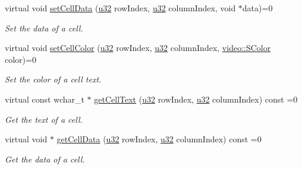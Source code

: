 \begin{DoxyCompactItemize}
\mbox{\label{classirr_1_1gui_1_1IGUITable_a88ddb4a8f63fd42a823b7f9363b9b877}} 
virtual void \hyperlink{classirr_1_1gui_1_1IGUITable_a88ddb4a8f63fd42a823b7f9363b9b877}{set\+Cell\+Data} (\hyperlink{namespaceirr_a0416a53257075833e7002efd0a18e804}{u32} row\+Index, \hyperlink{namespaceirr_a0416a53257075833e7002efd0a18e804}{u32} column\+Index, void $\ast$data)=0
\begin{DoxyCompactList}\small\item\em Set the data of a cell. \end{DoxyCompactList}\item 
\mbox{\label{classirr_1_1gui_1_1IGUITable_abc650141a64f7e9f61cc5f8521b51ab4}} 
virtual void \hyperlink{classirr_1_1gui_1_1IGUITable_abc650141a64f7e9f61cc5f8521b51ab4}{set\+Cell\+Color} (\hyperlink{namespaceirr_a0416a53257075833e7002efd0a18e804}{u32} row\+Index, \hyperlink{namespaceirr_a0416a53257075833e7002efd0a18e804}{u32} column\+Index, \hyperlink{classirr_1_1video_1_1SColor}{video\+::\+S\+Color} color)=0
\begin{DoxyCompactList}\small\item\em Set the color of a cell text. \end{DoxyCompactList}\item 
\mbox{\label{classirr_1_1gui_1_1IGUITable_a73ee7498cab65b75dafc60e0deb8c85b}} 
virtual const wchar\+\_\+t $\ast$ \hyperlink{classirr_1_1gui_1_1IGUITable_a73ee7498cab65b75dafc60e0deb8c85b}{get\+Cell\+Text} (\hyperlink{namespaceirr_a0416a53257075833e7002efd0a18e804}{u32} row\+Index, \hyperlink{namespaceirr_a0416a53257075833e7002efd0a18e804}{u32} column\+Index) const =0
\begin{DoxyCompactList}\small\item\em Get the text of a cell. \end{DoxyCompactList}\item 
\mbox{\label{classirr_1_1gui_1_1IGUITable_a73332c6970e47345d42dde26f1b992cd}} 
virtual void $\ast$ \hyperlink{classirr_1_1gui_1_1IGUITable_a73332c6970e47345d42dde26f1b992cd}{get\+Cell\+Data} (\hyperlink{namespaceirr_a0416a53257075833e7002efd0a18e804}{u32} row\+Index, \hyperlink{namespaceirr_a0416a53257075833e7002efd0a18e804}{u32} column\+Index) const =0
\begin{DoxyCompactList}\small\item\em Get the data of a cell. \end{DoxyCompactList}\item 

\end{DoxyCompactItemize}
